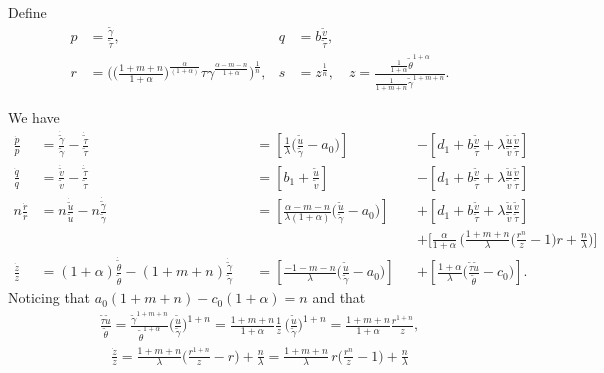 \documentclass[a4paper,11pt]{article}
\def\tg{{\tilde{\gamma}}}
\def\tv{{\tilde{v}}}
\def\tth{{\tilde{\theta}}}
\def\ts{{\tilde{\tau}}}
\def\tu{{\tilde{u}}}
\def\dtg{\dot{\tilde{\gamma}}}
\def\dtv{\dot{\tilde{v}}}
\def\dtth{\dot{\tilde{\theta}}}
\def\dts{\dot{\tilde{\tau}}}
\def\dtu{\dot{\tilde{u}}}
\def\dpp{\dot{p}}
\def\dqq{\dot{q}}
\def\drr{\dot{r}}
\begin{document}
Define 
\begin{equation}\label{eq:pqrsdef}
 \begin{aligned}
  p &= \frac{\tg}{\ts}, & q&=b \frac{\tv}{\ts},\\
  r &= \Big(\Big(\frac{1+m+n}{1+\alpha}\Big)^{\frac{\alpha}{(1+\alpha)}}\tau \gamma^{\frac{\alpha-m-n}{1+\alpha}}\Big)^{\frac{1}{n}} , & s&=z^{\frac{1}{n}}, \quad z=\frac{ \frac{1}{1+\alpha} \tth^{1+\alpha} }{ \frac{1}{1+m+n} \tg^{1+m+n} }.
 \end{aligned}
\end{equation}

We have
\begin{align*}
 \frac{\dpp}{p}&=\frac{\dtg}{\tg} - \frac{\dts}{\ts}& &=\left[\frac{1}{\lambda }\Big(\frac{\tu}{\tg}-a_0\Big)\right] & &-\left[d_1 + b\frac{\tv}{\ts} + \lambda\frac{\tu}{\tv}\frac{\tv}{\ts}\right]\\
 \frac{\dqq}{q}&=\frac{\dtv}{\tv} - \frac{\dts}{\ts}& &=\left[b_1 +\frac{\tu}{\tv}\right] & &-\left[d_1 + b\frac{\tv}{\ts} + \lambda\frac{\tu}{\tv}\frac{\tv}{\ts}\right]\\
 n\frac{\drr}{r}&=n\frac{\dtu}{\tu} -n\frac{\dtg}{\tg}& &=\left[\frac{\alpha-m-n}{\lambda(1+\alpha) }\Big(\frac{\tu}{\tg}-a_0\Big)\right]& &+\left[d_1 + b\frac{\tv}{\ts} + \lambda\frac{\tu}{\tv}\frac{\tv}{\ts}\right]\\
 & & & & &+ \Big[\frac{\alpha}{1+\alpha}\, \Big(\frac{1+m+n}{\lambda} \Big(\frac{r^n}{z}-1\Big)r + \frac{n}{\lambda}\Big)\Big]\\
 \frac{\dot{z}}{z} &= (1+\alpha)\frac{\dtth}{\tth} - (1+m+n)\frac{\dtg}{\tg} & &=\left[\frac{-1-m-n}{\lambda }\Big(\frac{\tu}{\tg}-a_0\Big)\right] & &+ \left[\frac{1+\alpha}{\lambda }\Big(\frac{\ts\tu}{\tth}-c_0\Big)\right].%
\end{align*}
Noticing that $\displaystyle a_0(1+m+n)-c_0(1+\alpha)=n$ and that
\begin{align*}
 \frac{\ts\tu}{\tth} = \frac{\tg^{1+m+n}}{\tth^{1+\alpha}}\Big(\frac{\tu}{\tg}\Big)^{1+n} = \frac{1+m+n}{1+\alpha} \frac{1}{z}\,\Big(\frac{\tu}{\tg}\Big)^{1+n} =  \frac{1+m+n}{1+\alpha} \frac{r^{1+n}}{z},
\end{align*}
\begin{align*}
\frac{\dot{z}}{z} = \frac{1+m+n}{\lambda}\Big(\frac{r^{1+n}}{z} - r \Big) + \frac{n}{\lambda} = \frac{1+m+n}{\lambda}\,r\Big(\frac{r^{n}}{z} - 1 \Big) + \frac{n}{\lambda}
\end{align*}
\end{document}
